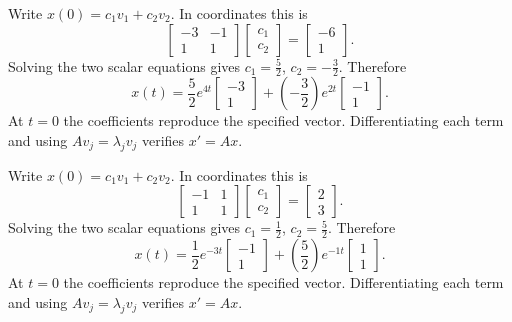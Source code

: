 Write $x(0)=c_1v_1+c_2v_2$. In coordinates this is
\[\left[\begin{matrix}-3 & -1\\1 & 1\end{matrix}\right]\begin{bmatrix}c_1\\c_2\end{bmatrix}=\left[\begin{matrix}-6\\1\end{matrix}\right].\]
Solving the two scalar equations gives $c_1=\frac{5}{2}$,
$c_2=- \frac{3}{2}$. Therefore
\[x(t)=\frac{5}{2}e^{4t}\left[\begin{matrix}-3\\1\end{matrix}\right]
+\left(- \frac{3}{2}\right)e^{2t}\left[\begin{matrix}-1\\1\end{matrix}\right].\]
At $t=0$ the coefficients reproduce the specified vector. Differentiating
each term and using $Av_j=\lambda_jv_j$ verifies $x'=Ax$.

Write $x(0)=c_1v_1+c_2v_2$. In coordinates this is
\[\left[\begin{matrix}-1 & 1\\1 & 1\end{matrix}\right]\begin{bmatrix}c_1\\c_2\end{bmatrix}=\left[\begin{matrix}2\\3\end{matrix}\right].\]
Solving the two scalar equations gives $c_1=\frac{1}{2}$,
$c_2=\frac{5}{2}$. Therefore
\[x(t)=\frac{1}{2}e^{-3t}\left[\begin{matrix}-1\\1\end{matrix}\right]
+\left(\frac{5}{2}\right)e^{-1t}\left[\begin{matrix}1\\1\end{matrix}\right].\]
At $t=0$ the coefficients reproduce the specified vector. Differentiating
each term and using $Av_j=\lambda_jv_j$ verifies $x'=Ax$.

